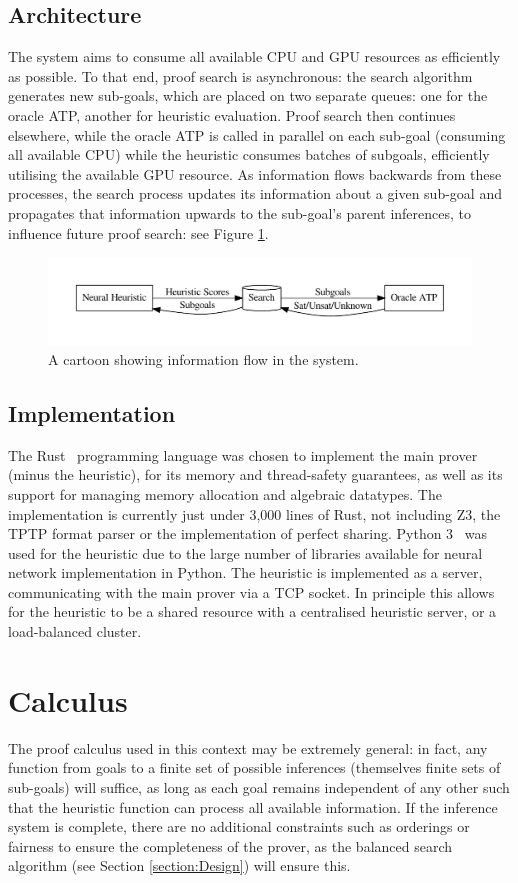 \documentclass[runningheads]{llncs}
\newcommand{\z}[1]{\textsc{Z3}}
\begin{document}
\subsection{Architecture}
The system aims to consume all available CPU and GPU resources as efficiently as possible.
To that end, proof search is asynchronous: the search algorithm generates new sub-goals, which are placed on two separate queues: one for the oracle ATP, another for heuristic evaluation.
Proof search then continues elsewhere, while the oracle ATP is called in parallel on each sub-goal (consuming all available CPU) while the heuristic consumes batches of subgoals, efficiently utilising the available GPU resource.
As information flows backwards from these processes, the search process updates its information about a given sub-goal and propagates that information upwards to the sub-goal's parent inferences, to influence future proof search: see Figure \ref{figure:architecture}.

\begin{figure}
	\includegraphics[width=\linewidth]{architecture}
	\caption{A cartoon showing information flow in the system.}
	\label{figure:architecture}
\end{figure}

\subsection{Implementation}
The Rust~\cite{rust} programming language was chosen to implement the main prover (minus the heuristic), for its memory and thread-safety guarantees, as well as its support for managing memory allocation and algebraic datatypes.
The implementation is currently just under 3,000 lines of Rust, not including \z3{}, the TPTP format parser or the implementation of perfect sharing.
Python 3~\cite{python3} was used for the heuristic due to the large number of libraries available for neural network implementation in Python.
The heuristic is implemented as a server, communicating with the main prover via a TCP socket.
In principle this allows for the heuristic to be a shared resource with a centralised heuristic server, or a load-balanced cluster.

\section{Calculus}
\label{section:Calculus}
The proof calculus used in this context may be extremely general: in fact, any function from goals to a finite set of possible inferences (themselves finite sets of sub-goals) will suffice, as long as each goal remains independent of any other such that the heuristic function can process all available information.  If the inference system is complete, there are no additional constraints such as orderings or fairness to ensure the completeness of the prover, as the balanced search algorithm (see Section \ref{section:Design}) will ensure this.
\end{document}
